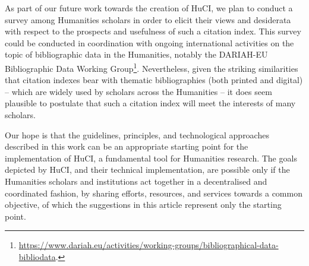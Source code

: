 As part of our future work towards the creation of HuCI, we plan to conduct a survey among Humanities scholars in order to elicit their views and desiderata with respect to the prospects and usefulness of such a citation index. This survey could be conducted in coordination with ongoing international activities on the topic of bibliographic data in the Humanities, notably the DARIAH-EU Bibliographic Data Working Group\footnote{\url{https://www.dariah.eu/activities/working-groups/bibliographical-data-bibliodata}.}. Nevertheless, given the striking similarities that citation indexes bear with thematic bibliographies (both printed and digital) -- which are widely used by scholars across the Humanities -- it does seem plausible to postulate that such a citation index will meet the interests of many scholars.

Our hope is that the guidelines, principles, and technological approaches described in this work can be an appropriate starting point for the implementation of HuCI, a fundamental tool for Humanities research. The goals depicted by HuCI, and their technical implementation, are possible only if the Humanities scholars and institutions act together in a decentralised and coordinated fashion, by sharing efforts, resources, and services towards a common objective, of which the suggestions in this article represent only the starting point. 